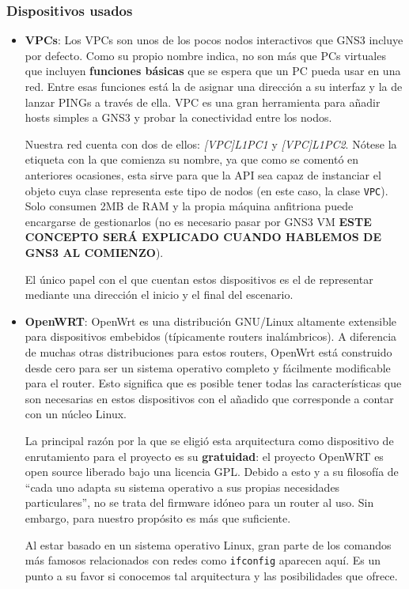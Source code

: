 \subsubsection{Dispositivos usados}
\begin{itemize}
\item \textbf{VPCs}: Los VPCs son unos de los pocos nodos interactivos que GNS3 incluye por defecto. Como su propio nombre indica, no son más que PCs virtuales que incluyen \textbf{funciones básicas} que se espera que un PC pueda usar en una red. Entre esas funciones está la de asignar una dirección a su interfaz y la de lanzar PINGs a través de ella. VPC es una gran herramienta para añadir hosts simples a GNS3 y probar la conectividad entre los nodos\cite{bookGNS}.

Nuestra red cuenta con dos de ellos: \textit{[VPC]L1PC1} y \textit{[VPC]L1PC2}. Nótese la etiqueta con la que comienza su nombre, ya que como se comentó en anteriores ocasiones, esta sirve para que la API sea capaz de instanciar el objeto cuya clase representa este tipo de nodos (en este caso, la clase \texttt{VPC}). Solo consumen 2MB de RAM y la propia máquina anfitriona puede encargarse de gestionarlos (no es necesario pasar por GNS3 VM \textbf{ESTE CONCEPTO SERÁ EXPLICADO CUANDO HABLEMOS DE GNS3 AL COMIENZO}).

El único papel con el que cuentan estos dispositivos es el de representar mediante una dirección el inicio y el final del escenario.

\item \textbf{OpenWRT}: OpenWrt es una distribución GNU/Linux altamente extensible para dispositivos embebidos (típicamente routers inalámbricos). A diferencia de muchas otras distribuciones para estos routers, OpenWrt está construido desde cero para ser un sistema operativo completo y fácilmente modificable para el router. Esto significa que es posible tener todas las características que son necesarias en estos dispositivos con el añadido que corresponde a contar con un núcleo Linux\cite{aboutopenwrt}.

La principal razón por la que se eligió esta arquitectura como dispositivo de enrutamiento para el proyecto es su \textbf{gratuidad}: el proyecto OpenWRT es open source liberado bajo una licencia GPL. Debido a esto y a su filosofía de ``cada uno adapta su sistema operativo a sus propias necesidades particulares'', no se trata del firmware idóneo para un router al uso. Sin embargo, para nuestro propósito es más que suficiente.

Al estar basado en un sistema operativo Linux, gran parte de los comandos más famosos relacionados con redes como \texttt{ifconfig} aparecen aquí. Es un punto a su favor si conocemos tal arquitectura y las posibilidades que ofrece.


\end{itemize}
